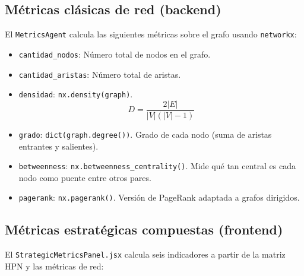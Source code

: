 \documentclass[12pt, letterpaper]{article}
\begin{document}
\subsection{Métricas clásicas de red (backend)}

El \texttt{MetricsAgent} calcula las siguientes métricas sobre el
grafo usando \texttt{networkx}:

\begin{itemize}[nosep]
  \item \texttt{cantidad\_nodos}: Número total de nodos en el grafo.
  \item \texttt{cantidad\_aristas}: Número total de aristas.
  \item \texttt{densidad}: \texttt{nx.density(graph)}.
    $$D = \frac{2|E|}{|V|(|V|-1)}$$
  \item \texttt{grado}: \texttt{dict(graph.degree())}. Grado de cada
    nodo (suma de aristas entrantes y salientes).
  \item \texttt{betweenness}: \texttt{nx.betweenness\_centrality()}.
    Mide qué tan central es cada nodo como puente entre otros pares.
  \item \texttt{pagerank}: \texttt{nx.pagerank()}. Versión de
    PageRank adaptada a grafos dirigidos.
\end{itemize}

\subsection{Métricas estratégicas compuestas (frontend)}

El \texttt{StrategicMetricsPanel.jsx} calcula seis indicadores a
partir de la matriz HPN y las métricas de red:
\end{document}
